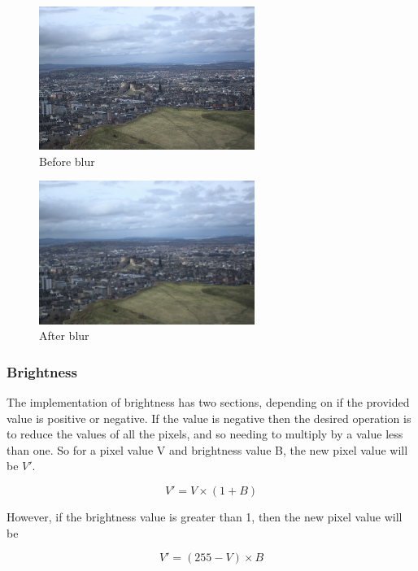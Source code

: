\documentclass[12pt,a4paper]{article}
\begin{document}
\begin{minipage}[t]{0.5\textwidth}
    \begin{figure}[H]
        \includegraphics[width=7cm]{no_blur.png}
        \caption{Before blur}
    \end{figure}

\end{minipage}
\begin{minipage}[t]{0.5\textwidth}
    \begin{figure}[H]
        \includegraphics[width=7cm]{blur.png}
        \caption{After blur}
    \end{figure}
\end{minipage}



\subsubsection{Brightness}

The implementation of brightness has two sections, depending on if the provided value is positive or negative. If the value is negative then the desired operation is to reduce the values of all the pixels, and so needing to multiply by a value less than one. So for a pixel value V and brightness value B, the new pixel value will be $V'$.

$$
    V'=V\times(1+B)
$$

However, if the brightness value is greater than 1, then the new pixel value will be

$$
    V'=(255-V)\times B
$$
\end{document}
